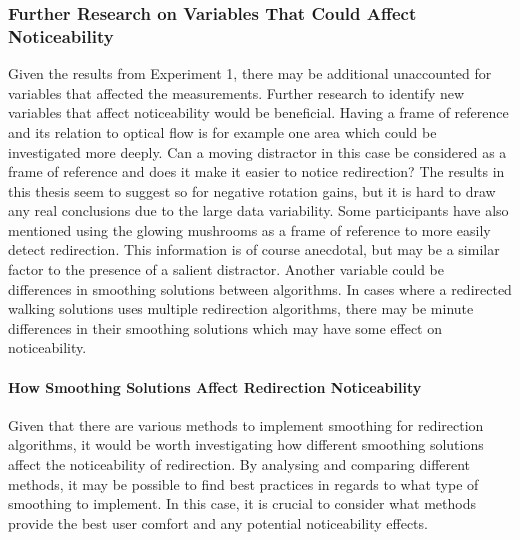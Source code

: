 \subsubsection{Further Research on Variables That Could Affect Noticeability}
Given the results from Experiment 1, there may be additional unaccounted for variables that affected the measurements. Further research to identify new variables that affect noticeability would be beneficial. Having a frame of reference and its relation to optical flow is for example one area which could be investigated more deeply. Can a moving distractor in this case be considered as a frame of reference and does it make it easier to notice redirection? The results in this thesis seem to suggest so for negative rotation gains, but it is hard to draw any real conclusions due to the large data variability. Some participants have also mentioned using the glowing mushrooms as a frame of reference to more easily detect redirection. This information is of course anecdotal, but may be a similar factor to the presence of a salient distractor. Another variable could be differences in smoothing solutions between algorithms. In cases where a redirected walking solutions uses multiple redirection algorithms, there may be minute differences in their smoothing solutions which may have some effect on noticeability. 

\paragraph{How Smoothing Solutions Affect Redirection Noticeability} 
Given that there are various methods to implement smoothing for redirection algorithms, it would be worth investigating how different smoothing solutions affect the noticeability of redirection. By analysing and comparing different methods, it may be possible to find best practices in regards to what type of smoothing to implement. In this case, it is crucial to consider what methods provide the best user comfort and any potential noticeability effects. 

